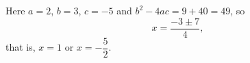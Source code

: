 Here $a=2$, $b=3$, $c=-5$ and $b^2-4ac=9+40=49$, so
\[x=\dfrac{-3\pm7}{4},\]
that is, $x=\boxed{1}$ or $x=\boxed{-\dfrac52}$.
